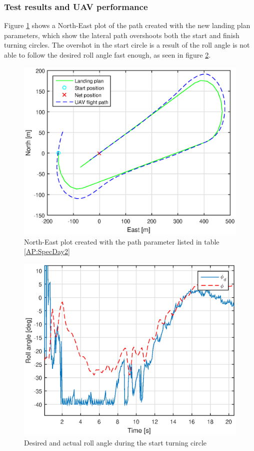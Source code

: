 \subsubsection{Test results and UAV performance}
Figure \ref{Fig:NorthEast1juni081328} shows a North-East plot of the path created with the new landing plan parameters, which show the lateral path overshoots both the start and finish turning circles. The overshot in the start circle is a result of the roll angle is not able to follow the desired roll angle fast enough, as seen in figure \ref{Fig:Roll1juni081328}.
\begin{figure}[H]
\centering
\includegraphics[scale=0.7]{figs/Experiment/NorthEast1juni081328.eps}
\caption{North-East plot created with the path parameter listed in table \ref{AP:SpecDay2}}
\label{Fig:NorthEast1juni081328}
\end{figure}
\begin{figure}[H]
\centering
\includegraphics[scale=0.7]{figs/Experiment/Roll1juni081328.eps}
\caption{Desired and actual roll angle during the start turning circle}
\label{Fig:Roll1juni081328}
\end{figure}
